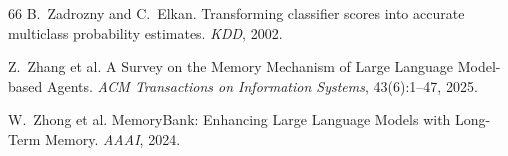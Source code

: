 \documentclass{article}
\begin{document}
\begin{thebibliography}{66}
B.~Zadrozny and C.~Elkan. Transforming classifier scores into accurate multiclass probability estimates. \emph{KDD}, 2002.

Z.~Zhang et al. A Survey on the Memory Mechanism of Large Language Model-based Agents. \emph{ACM Transactions on Information Systems}, 43(6):1--47, 2025.

W.~Zhong et al. MemoryBank: Enhancing Large Language Models with Long-Term Memory. \emph{AAAI}, 2024.

\end{thebibliography}

\appendix
\end{document}

